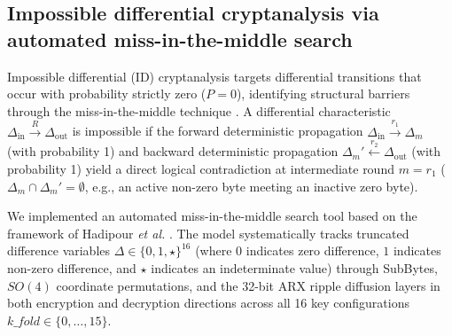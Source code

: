 \documentclass[review,12pt]{elsarticle}
\begin{document}
\subsection{Impossible differential cryptanalysis via automated miss-in-the-middle search}
Impossible differential (ID) cryptanalysis targets differential transitions that occur with probability strictly zero ($P = 0$), identifying structural barriers through the miss-in-the-middle technique \cite{hadipour2023impossible}. A differential characteristic $\Delta_{\text{in}} \xrightarrow{R} \Delta_{\text{out}}$ is impossible if the forward deterministic propagation $\Delta_{\text{in}} \xrightarrow{r_1} \Delta_{m}$ (with probability 1) and backward deterministic propagation $\Delta_{m}' \xleftarrow{r_2} \Delta_{\text{out}}$ (with probability 1) yield a direct logical contradiction at intermediate round $m = r_1$ ($\Delta_m \cap \Delta_m' = \emptyset$, e.g., an active non-zero byte meeting an inactive zero byte).

We implemented an automated miss-in-the-middle search tool based on the framework of Hadipour \textit{et al.} \cite{hadipour2023impossible}. The model systematically tracks truncated difference variables $\Delta \in \{0, 1, \star\}^{16}$ (where $0$ indicates zero difference, $1$ indicates non-zero difference, and $\star$ indicates an indeterminate value) through SubBytes, $SO(4)$ coordinate permutations, and the 32-bit ARX ripple diffusion layers in both encryption and decryption directions across all 16 key configurations $\mathit{k\_fold} \in \{0, \dots, 15\}$.
\end{document}
